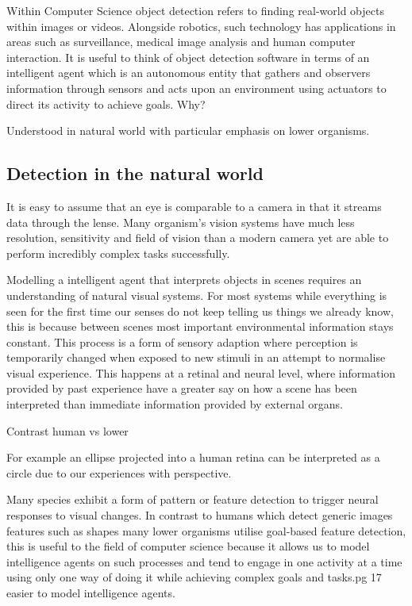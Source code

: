 \documentclass{mproj}
\begin{document}
Within Computer Science object detection refers to finding real-world objects within images or videos. Alongside robotics, such technology has applications in areas such as surveillance, medical image analysis and human computer interaction. It is useful to think of object detection software in terms of an intelligent agent which is an autonomous entity that gathers and observers information through sensors and acts upon an environment using actuators to direct its activity to achieve goals.\cite{Norvig2003} Why?

Understood in natural world with particular emphasis on lower organisms.

\subsection{Detection in the natural world}

It is easy to assume that an eye is comparable to a camera in that it streams data through the lense. Many organism's vision systems have much less resolution, sensitivity and field of vision than a modern camera yet are able to perform incredibly complex tasks successfully. 

Modelling a intelligent agent that interprets objects in scenes requires an understanding of natural visual systems. For most systems while everything is seen for the first time our senses do not keep telling us things we already know, this is because between scenes most important environmental information stays constant. This process is a form of sensory adaption where perception is temporarily changed when exposed to new stimuli in an attempt to normalise visual experience.\cite{Webster2015} This happens at a retinal and neural level, where information provided by past experience have a greater say on how a scene has been interpreted than immediate information provided by external organs. 

Contrast human vs lower

For example an ellipse projected into a human retina can be interpreted as a circle due to our experiences with perspective. 

Many species exhibit a form of pattern or feature detection to trigger neural responses to visual changes. In contrast to humans which detect generic images features such as shapes many lower organisms utilise goal-based feature detection, this is useful to the field of computer science because it allows us to model intelligence agents on such processes and tend to engage in one activity at a time using only one way of doing it \cite{} while achieving complex goals and tasks.pg 17 easier to model intelligence agents.
\end{document}
